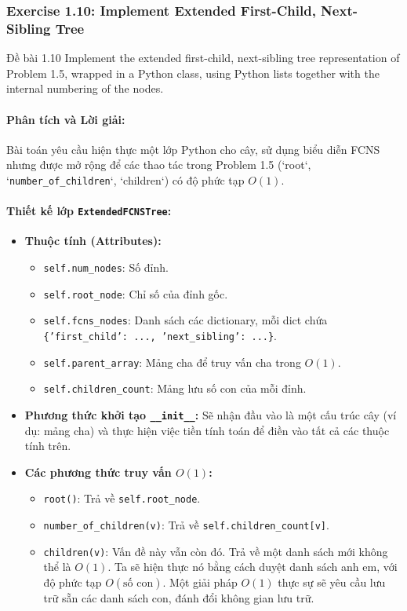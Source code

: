 \documentclass[a4paper,12pt]{article}
\begin{document}
\subsubsection{Exercise 1.10: Implement Extended First-Child, Next-Sibling Tree}
\begin{problembox}{Đề bài 1.10}
    Implement the extended first-child, next-sibling tree representation of Problem 1.5, wrapped in a Python class, using Python lists together with the internal numbering of the nodes.
\end{problembox}

\paragraph{Phân tích và Lời giải:}
Bài toán yêu cầu hiện thực một lớp Python cho cây, sử dụng biểu diễn FCNS nhưng được mở rộng để các thao tác trong Problem 1.5 (`root`, `\texttt{number\_of\_children}`, `children`) có độ phức tạp $O(1)$.

\paragraph{Thiết kế lớp \texttt{ExtendedFCNSTree}:}
\begin{itemize}
    \item \textbf{Thuộc tính (Attributes):}
        \begin{itemize}
            \item \texttt{self.num\_nodes}: Số đỉnh.
            \item \texttt{self.root\_node}: Chỉ số của đỉnh gốc.
            \item \texttt{self.fcns\_nodes}: Danh sách các dictionary, mỗi dict chứa \texttt{\{'first\_child': ..., 'next\_sibling': ...\}}.
            \item \texttt{self.parent\_array}: Mảng cha để truy vấn cha trong $O(1)$.
            \item \texttt{self.children\_count}: Mảng lưu số con của mỗi đỉnh.
        \end{itemize}
    \item \textbf{Phương thức khởi tạo \texttt{\_\_init\_\_}:} Sẽ nhận đầu vào là một cấu trúc cây (ví dụ: mảng cha) và thực hiện việc tiền tính toán để điền vào tất cả các thuộc tính trên.
    \item \textbf{Các phương thức truy vấn $O(1)$:}
        \begin{itemize}
            \item \texttt{root()}: Trả về \texttt{self.root\_node}.
            \item \texttt{number\_of\_children(v)}: Trả về \texttt{self.children\_count[v]}.
            \item \texttt{children(v)}: Vấn đề này vẫn còn đó. Trả về một danh sách mới không thể là $O(1)$. Ta sẽ hiện thực nó bằng cách duyệt danh sách anh em, với độ phức tạp $O(\text{số con})$. Một giải pháp $O(1)$ thực sự sẽ yêu cầu lưu trữ sẵn các danh sách con, đánh đổi không gian lưu trữ.
        \end{itemize}
\end{itemize}
\end{document}
